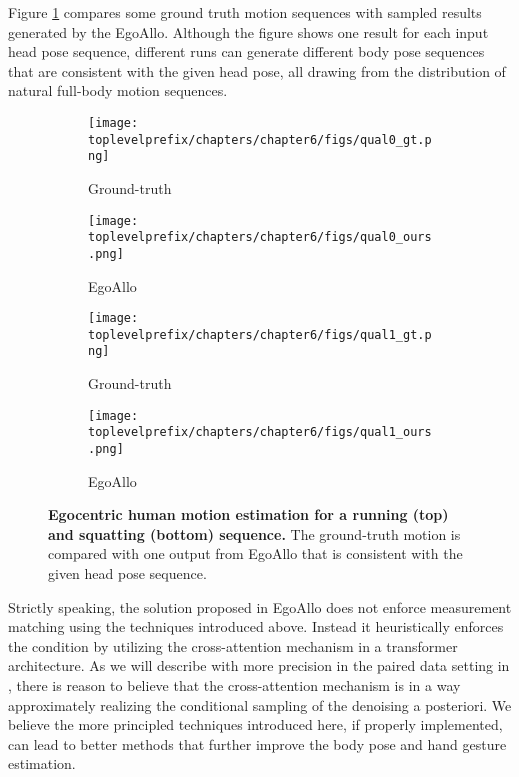 \documentclass[../../book-main.tex]{subfiles}
\begin{document}
Figure \ref{fig:comparison} compares some ground truth motion sequences with sampled results generated by the EgoAllo. Although the figure shows one result for each input head pose sequence, different runs can generate different body pose sequences that are consistent with the given head pose, all drawing from the distribution of natural full-body motion sequences.
\begin{figure}[t]
\centering
\begin{subfigure}{0.45\textwidth}
  \centering
  \texttt{[image: \\toplevelprefix/chapters/chapter6/figs/qual0\_gt.png]}
  \caption{\centering Ground-truth}
\end{subfigure}
\hfill
\begin{subfigure}{0.45\textwidth}
  \centering
  \texttt{[image: \\toplevelprefix/chapters/chapter6/figs/qual0\_ours.png]}
  \caption{EgoAllo}
\end{subfigure}

\begin{subfigure}{0.45\textwidth}
  \centering
  \texttt{[image: \\toplevelprefix/chapters/chapter6/figs/qual1\_gt.png]}
  \caption{\centering Ground-truth}
\end{subfigure}
\hfill
\begin{subfigure}{0.45\textwidth}
  \centering
  \texttt{[image: \\toplevelprefix/chapters/chapter6/figs/qual1\_ours.png]}
  \caption{EgoAllo}
\end{subfigure}

\caption{
\textbf{Egocentric human motion estimation for a running (top) and squatting (bottom) sequence.}
The ground-truth motion is compared with one output from EgoAllo that is consistent with the given head pose sequence. 
}
\label{fig:comparison}
\end{figure}

Strictly speaking, the solution proposed in EgoAllo \cite{yi2024egoallo} does
not enforce measurement matching using the techniques introduced above. Instead
it heuristically enforces the condition by utilizing  the cross-attention
mechanism in a transformer architecture. As we will describe with more precision
in the paired data setting in , there is reason to believe that the
cross-attention mechanism is in a way approximately realizing the conditional
sampling of the denoising a posteriori. We believe the more principled
techniques introduced here, if properly implemented, can lead to better methods
that further improve the body pose and hand gesture estimation. 
\end{document}
